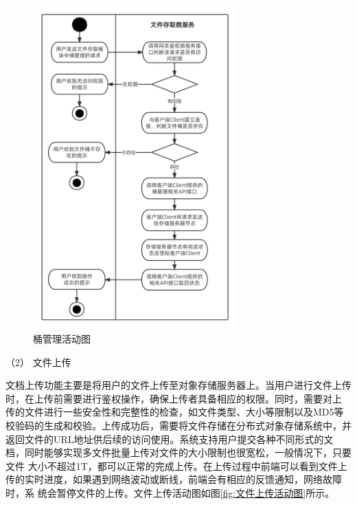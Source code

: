 \begin{figure}[htb]
    \centering
    \includegraphics[width=0.7\textwidth]{my_figures/chapter4/桶管理活动图.png}
    \caption{桶管理活动图}
    \label{fig:桶管理活动图}
\end{figure}

（2） 文件上传

文档上传功能主要是将用户的文件上传至对象存储服务器上。当用户进行文件上传时，在上传前需要进行鉴权操作，确保上传者具备相应的权限。同时，需要对上
传的文件进行一些安全性和完整性的检查，如文件类型、大小等限制以及MD5等校验码的生成和校验。上传成功后，需要将文件存储在分布式对象存储系统中，并
返回文件的URL地址供后续的访问使用。系统支持用户提交各种不同形式的文档，同时能够实现多文件批量上传对文件的大小限制也很宽松，一般情况下，只要文件
大小不超过1T，都可以正常的完成上传。在上传过程中前端可以看到文件上传的实时进度，如果遇到网络波动或断线，前端会有相应的反馈通知，网络故障时，系
统会暂停文件的上传。文件上传活动图如图\ref{fig:文件上传活动图}所示。

